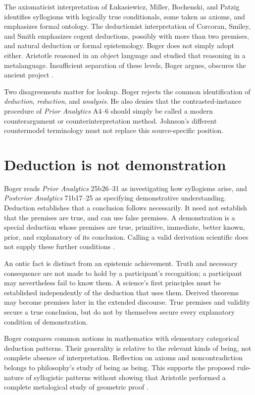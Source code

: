 The axiomaticist interpretation of \L{}ukasiewicz, Miller, Bochenski, and
Patzig identifies syllogisms with logically true conditionals, some taken as
axioms, and emphasizes formal ontology. The deductionist interpretation
of Corcoran, Smiley, and Smith emphasizes cogent deductions, possibly with
more than two premises, and natural deduction or formal epistemology.
Boger does not simply adopt either. Aristotle reasoned in an object
language and studied that reasoning in a metalanguage. Insufficient
separation of these levels, Boger argues, obscures the ancient project
\parencite[pp.~104--107]{Boger2004UnderlyingLogic}.

Two disagreements matter for lookup. Boger rejects the common
identification of \emph{deduction}, \emph{reduction}, and \emph{analysis}.
He also denies that the contrasted-instance procedure of
\emph{Prior Analytics} A4--6 should simply be called a modern
counterargument or counterinterpretation method. Johnson's different
countermodel terminology must not replace this source-specific position.

\section{Deduction is not demonstration}
\label{sec:p13-boger-demonstration}

Boger reads \emph{Prior Analytics} 25b26--31 as investigating how syllogisms
arise, and \emph{Posterior Analytics} 71b17--25 as specifying demonstrative
understanding. Deduction establishes that a conclusion follows necessarily.
It need not establish that the premises are true, and can use false premises.
A demonstration is a special deduction whose premises are true, primitive,
immediate, better known, prior, and explanatory of its conclusion.
Calling a valid derivation scientific does not supply these further
conditions \parencite[pp.~107--110]{Boger2004UnderlyingLogic}.

An ontic fact is distinct from an epistemic achievement. Truth and
necessary consequence are not made to hold by a participant's recognition;
a participant may nevertheless fail to know them. A science's first
principles must be established independently of the deduction that uses
them. Derived theorems may become premises later in the extended discourse.
True premises and validity secure a true conclusion, but do not by
themselves secure every explanatory condition of demonstration.

Boger compares common notions in mathematics with elementary categorical
deduction patterns. Their generality is relative to the relevant kinds
of being, not complete absence of interpretation. Reflection on axioms
and noncontradiction belongs to philosophy's study of being as being.
This supports the proposed rule-nature of syllogistic patterns without
showing that Aristotle performed a complete metalogical study of
geometric proof \parencite[pp.~109--114]{Boger2004UnderlyingLogic}.

